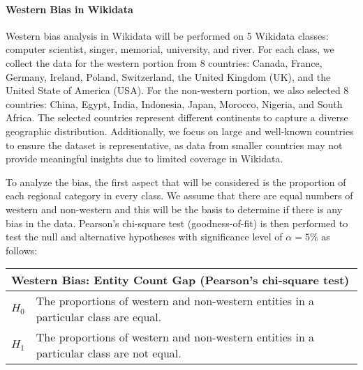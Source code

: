 \paragraph{Western Bias in Wikidata}

Western bias analysis in Wikidata will be performed on 5 Wikidata classes: computer scientist, singer, memorial, university, and river. For each class, we collect the data for the western portion from 8 countries: Canada, France, Germany, Ireland, Poland, Switzerland, the United Kingdom (UK), and the United State of America (USA). For the non-western portion, we also selected 8 countries: China, Egypt, India, Indonesia, Japan, Morocco, Nigeria, and South Africa. The selected countries represent different continents to capture a diverse geographic distribution. Additionally, we focus on large and well-known countries to ensure the dataset is representative, as data from smaller countries may not provide meaningful insights due to limited coverage in Wikidata.

To analyze the bias, the first aspect that will be considered is the proportion of each regional category in every class. We assume that there are equal numbers of western and non-western and this will be the basis to determine if there is any bias in the data. Pearson's chi-square test (goodness-of-fit) is then performed to test the null and alternative hypotheses with significance level of \(\alpha=5\%\) as follows:



\begin{table}[h]
    \centering
    \renewcommand{\arraystretch}{1.3}
    \begin{tabular}{|l p{12cm}|} 
        \hline
        \multicolumn{2}{|l|}{\textbf{Western Bias: Entity Count Gap (Pearson's chi-square test)}} \\
        \hline
        \textbf{$H_0$} & The proportions of western and non-western entities in a particular class are equal. \\
        \textbf{$H_1$} & The proportions of western and non-western entities in a particular class are not equal. \\
        \hline
    \end{tabular}
\end{table}

